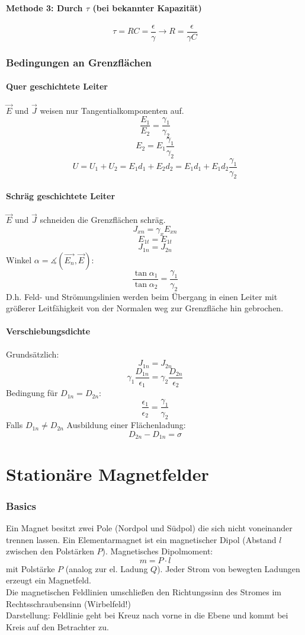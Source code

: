 \documentclass[12pt,a4paper]{article}
\begin{document}
\subsection{Methode 3: Durch $\tau$ (bei bekannter Kapazität)}
\[\tau = RC = \frac{\epsilon}{\gamma} \rightarrow R = \frac{\epsilon}{\gamma C}\]

\section{Bedingungen an Grenzflächen}
\subsection{Quer geschichtete Leiter}
$\vec{E}$ und $\vec{J}$ weisen nur Tangentialkomponenten auf.
\[\frac{E_1}{E_2} = \frac{\gamma_1}{\gamma_2}\]
\[E_2 = E_1\frac{\gamma_1}{\gamma_2}\]
\[U = U_1 + U_2 = E_1 d_1 + E_2 d_2 = E_1 d_1 + E_1 d_2\frac{\gamma_1}{\gamma_2}\]

\subsection{Schräg geschichtete Leiter}
$\vec{E}$ und $\vec{J}$ schneiden die Grenzflächen schräg.\\
\[J_{xn} = \gamma_x E_{xn}\]
\[E_{1t} = E_{1t}\]
\[J_{1n} = J_{2n}\]
Winkel $\alpha = \measuredangle{(\vec{E_n}, \vec{E})}$:
\[\frac{\tan\alpha_1}{\tan\alpha_2} = \frac{\gamma_1}{\gamma_2}\]
D.h. Feld- und Strömungslinien werden beim Übergang in einen  Leiter mit größerer Leitfähigkeit von der Normalen weg zur Grenzfläche hin gebrochen.

\subsection{Verschiebungsdichte}
Grundsätzlich:
\[J_{1n} = J_{2n}\]
\[\gamma_1 \frac{D_{1n}}{\epsilon_1} = \gamma_2 \frac{D_{2n}}{\epsilon_2}\]
Bedingung für $D_{1n} = D_{2n}$:
\[\frac{\epsilon_1}{\epsilon_2} = \frac{\gamma_1}{\gamma_2}\]
Falls $D_{1n} \neq D_{2n}$ Ausbildung einer Flächenladung:
\[D_{2n} - D_{1n} = \sigma\]

\part{Stationäre Magnetfelder}
\section{Basics}
Ein Magnet besitzt zwei Pole (Nordpol und Südpol) die sich nicht voneinander trennen lassen. Ein Elementarmagnet ist ein magnetischer Dipol (Abstand $l$ zwischen den Polstärken $P$).
Magnetisches Dipolmoment:
\[m=P\cdot l\]
mit Polstärke $P$ (analog zur el. Ladung $Q$).
Jeder Strom von bewegten Ladungen erzeugt ein Magnetfeld.\\
Die magnetischen Feldlinien umschließen den Richtungssinn des Stromes im Rechtsschraubensinn (Wirbelfeld!)\\
Darstellung: Feldlinie geht bei Kreuz nach vorne in die Ebene und kommt bei Kreis auf den Betrachter zu.
\end{document}
